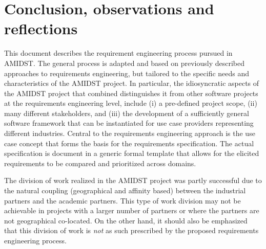 \section{Conclusion, observations and reflections} 
\label{sec:conclusion}

This document describes the requirement engineering process pursued in AMIDST. The general process is  adapted and based
on previously described approaches to requirements engineering, but tailored to the specific needs and characteristics of the AMIDST
project. In particular, the idiosyncratic aspects of the AMIDST project that combined distinguishes it from other software
projects at the requirements engineering level, include (i) a pre-defined project scope, (ii) many different
stakeholders, and (iii) the development of a sufficiently general software framework that can be instantiated for
use case providers representing different industries.  Central to the requirements engineering approach is the use case
concept that forms the basis for the requirements specification. The actual specification is document in a generic
formal template that allows for the elicited requirements to be compared and prioritized across domains. 

The division of work realized in the AMIDST project was partly successful due to the natural coupling (geographical and
affinity based) between the industrial partners and the academic partners. This type of work division may not be
achievable in projects with a larger number of partners or where the partners are not geographical co-located. On the
other hand, it should also be emphasized that this division of work is \emph{not} as such prescribed by the proposed
requirements engineering process. 
